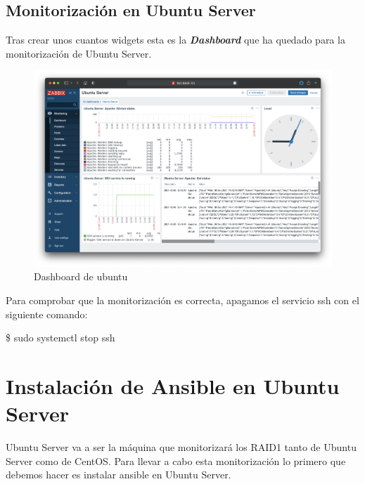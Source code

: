 \subsection{Monitorización en Ubuntu Server}
Tras crear unos cuantos widgets esta es la \textbf{\emph{Dashboard}} que ha quedado para la monitorización de Ubuntu Server.
    \begin{figure}[H]
        \centering
        \includegraphics[scale=0.3]{images/ubuntu_dashboard.png}
        \caption{Dashboard de ubuntu}
        \label{fig:ubuntu_dashboard}
    \end{figure}
Para comprobar que la monitorización es correcta, apagamos el servicio ssh con el siguiente comando:
\begin{tcolorbox}[colback=black!10, halign=left]
    \$ sudo systemctl stop ssh
\end{tcolorbox}

\section{Instalación de Ansible en Ubuntu Server}
Ubuntu Server va a ser la máquina que monitorizará los RAID1 tanto de Ubuntu Server como de CentOS. Para llevar a cabo esta
monitorización lo primero que debemos hacer es instalar ansible en Ubuntu Server.

